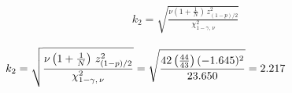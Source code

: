 \documentclass[12pt]{article}
\begin{document}
\pagestyle{empty}
\Large
{}
\pagecolor{ehandbook}

\boldmath 

\vspace*{-1.75in}

\begin{eqnarray*}
k_2 = \sqrt{\frac{\nu \left(1 + \frac{1}{N}\right) \, z^2_{(1-p)/2}}{\chi^2_{1-\gamma, \, \nu}}}
\end{eqnarray*}



\vspace*{.25in}

\begin{eqnarray*}
\hspace*{-1in}
k_2 = \sqrt{\frac{\nu\left(1 + \frac{1}{N}\right) \, z^2_{(1-p)/2}}{\chi^2_{1-\gamma, \, \nu}}} =\sqrt{\frac{42\left(\frac{44}{43}\right) (-1.645)^2}{23.650}} = 2.217
\end{eqnarray*}
\end{document}
